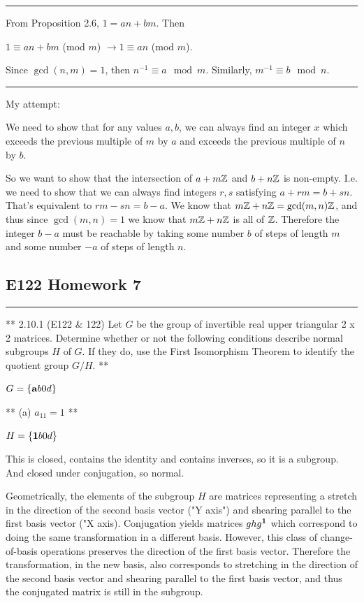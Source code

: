 \hrule

From Proposition 2.6, $1 = an + bm$. Then

$1 \equiv an + bm$ (mod $m$) $\rightarrow 1 \equiv an$ (mod $m$).

Since $\gcd(n, m) = 1$, then $n^{-1} \equiv a \mod m$. Similarly, $m^{-1}
\equiv b \mod n$.

\hrule
My attempt:

We need to show that for any values $a,b$, we can always find an integer $x$
which exceeds the previous multiple of $m$ by $a$ and exceeds the previous
multiple of $n$ by $b$.

So we want to show that the intersection of $a + m\mathbb{Z}$ and $b + n\mathbb{Z}$ is
non-empty. I.e. we need to show that we can always find integers $r, s$
satisfying $a + rm = b +sn$. That's equivalent to $rm - sn = b - a$. We know
that $m\mathbb{Z} + n\mathbb{Z} = \gcd(m, n)\mathbb{Z}$, and thus since $\gcd(m, n) = 1$ we know that
$m\mathbb{Z} + n\mathbb{Z}$ is all of $\mathbb{Z}$. Therefore the integer $b - a$ must be reachable by
taking some number $b$ of steps of length $m$ and some number $-a$ of steps of
length $n$.

\subsection{E122 Homework 7}

\hrule


** 2.10.1 (E122 \& 122) Let $G$ be the group of invertible real upper triangular
2 x 2 matrices. Determine whether or not the following conditions describe
normal subgroups $H$ of $G$. If they do, use the First Isomorphism Theorem to
identify the quotient group $G/H$. **

$G = \left\{ \mathbf{a}{b}
                 {0}{d} \right\}$

** (a) $a_{11} = 1$ **

$H = \left\{ \mathbf{1}{b}
                 {0}{d} \right\}$

This is closed, contains the identity and contains inverses, so it is a
subgroup. And closed under conjugation, so normal.

Geometrically, the elements of the subgroup $H$ are matrices representing a
stretch in the direction of the second basis vector ("Y axis") and shearing
parallel to the first basis vector ("X axis). Conjugation yields matrices
$ghg^{\mathbf 1}$ which correspond to doing the same transformation in a different
basis. However, this class of change-of-basis operations preserves the
direction of the first basis vector. Therefore the transformation, in the new
basis, also corresponds to stretching in the direction of the second basis
vector and shearing parallel to the first basis vector, and thus the conjugated
matrix is still in the subgroup.

